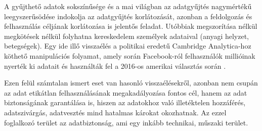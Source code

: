 A gyűjthető adatok sokszínűsége és a mai világban az adatgyűjtés nagymértékű leegyszerűsödése indokolja az adatgyűjtés korlátozását, azonban a feldolgozás és felhasználás céljának korlátozása is jelentős feladat. Utóbbiak megszorítása nélkül megkötések nélkül folyhatna kereskedelem személyek adataival (anyagi helyzet, betegségek). Egy ide illő visszaélés a politikai eredetű Cambridge Analytica-hoz köthető manipulációs folyamat, amely során Facebook-ról felhasználók millióinak nyerték ki adatait és használták fel a 2016-os amerikai választás során \cite{cambridge-analytica-visszaeles}.

Ezen felül számtalan ismert eset van hasonló visszaélésekről, azonban nem csupán az adat etikátlan felhasználásának megakadályozása fontos cél, hanem az adat biztonságának garantálása is, hiszen az adatokhoz való illetéktelen hozzáférés, adatszivárgás, adatvesztés mind hatalmas károkat okozhatnak. Az ezzel foglalkozó terület az adatbiztonság, ami egy inkább technikai, műszaki terület.